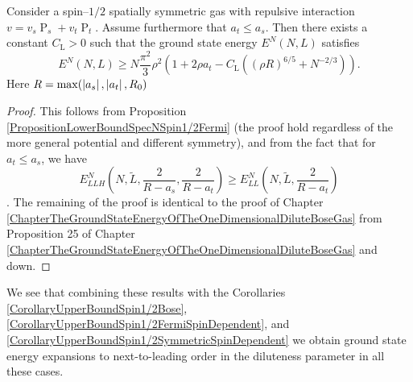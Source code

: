 \begin{theorem}
	\label{TheoremLowerBoundSpinDependentSpin1/2SpatiallySymmetric}
	Consider a spin--$ 1/2 $ spatially symmetric gas with repulsive interaction  $v=v_s\operatorname{P}_s+v_t\operatorname{P}_t$. Assume furthermore that $ a_t\leq a_s $. Then there exists a constant $C_\text{L}>0$ such that the ground state energy $E^N(N,L)$ satisfies
	\begin{equation}
	\label{eqlower}
	E^N(N,L)\geq N\frac{\pi^2}{3}\rho^2\left(1+2\rho a_t-C_\text{L}\left((\rho R)^{6/5}+N^{-2/3}\right)\right).
	\end{equation}
	Here $ R=\max(\left\lvert a_s \right\rvert, \left\lvert a_t \right\rvert, R_0) $
\end{theorem}
\begin{proof}
	This follows from Proposition \ref{PropositionLowerBoundSpecNSpin1/2Fermi} (the proof hold regardless of the more general potential and different symmetry), and from the fact that for $ a_t\leq a_s $, we have $$ E_{LLH}^N\left(N,\tilde{L},\frac{2}{R-a_s},\frac{2}{R-a_t}\right)\geq E^N_{LL}\left(N,\tilde{L},\frac{2}{R-a_t}\right) $$. The remaining of the proof is identical to the proof of Chapter \ref{ChapterTheGroundStateEnergyOfTheOneDimensionalDiluteBoseGas} from Proposition 25 of Chapter \ref{ChapterTheGroundStateEnergyOfTheOneDimensionalDiluteBoseGas} and down.
\end{proof}
We see that combining these results with the Corollaries \ref{CorollaryUpperBoundSpin1/2Bose}, \ref{CorollaryUpperBoundSpin1/2FermiSpinDependent}, and \ref{CorollaryUpperBoundSpin1/2SymmetricSpinDependent} we obtain ground state energy expansions to next-to-leading order in the diluteness parameter in all these cases. 





